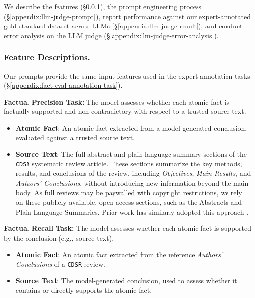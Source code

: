\documentclass{article}
\begin{document}
We describe the features (\S\ref{appendix:llm-judge-features}), the prompt engineering process (\S\ref{appendix:llm-judge-prompt}), report performance against our expert-annotated gold-standard dataset across LLMs (\S\ref{appendix:llm-judge-result}), and conduct error analysis on the LLM judge (\S\ref{appendix:llm-judge-error-analysis}).

\subsubsection{Feature Descriptions.}\label{appendix:llm-judge-features}

Our prompts provide the same input features used in the expert annotation tasks (\S\ref{appendix:fact-eval-annotation-task}).

\noindent\textbf{Factual Precision Task:} The model assesses whether each atomic fact is factually supported and non-contradictory with respect to a trusted source text.
\begin{itemize}[leftmargin=0.6cm]
    \item \textbf{Atomic Fact}: An atomic fact extracted from a model-generated conclusion, evaluated against a trusted source text.
    \item \textbf{Source Text}: The full abstract and plain-language summary sections of the \texttt{CDSR} systematic review article. These sections summarize the key methods, results, and conclusions of the review, including \textit{Objectives}, \textit{Main Results}, and \textit{Authors' Conclusions}, without introducing new information beyond the main body. As full reviews may be paywalled with copyright restrictions, we rely on these publicly available, open-access sections, such as the Abstracts and Plain-Language Summaries. Prior work has similarly adopted this approach \cite{bakker-kamps-2024-cochrane, devaraj-etal-2021-paragraph, polzak2025can, tang2023evaluating}.
\end{itemize}

\noindent\textbf{Factual Recall Task:} The model assesses whether each atomic fact is supported by the conclusion (e.g., source text).
\begin{itemize}[leftmargin=0.6cm]
    \item \textbf{Atomic Fact}: An atomic fact extracted from the reference \textit{Authors' Conclusions} of a \texttt{CDSR} review.
    \item \textbf{Source Text}: The model-generated conclusion, used to assess whether it contains or directly supports the atomic fact.
\end{itemize}
\end{document}
